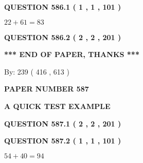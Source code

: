 \documentclass[12pt]{article}
\begin{document}
   
  
\vspace{0.2in}
  
{\textbf{\Large{QUESTION
586.1 
 ( 1 , 1 , 101 )
}}}
  
  
 
 

$ %
22 +  %
61=   %
83$
 
 
  
\vspace{0.2in}
  
{\textbf{\Large{QUESTION
586.2 
 ( 2 , 2 , 201 )
}}}
  
  
   
   
 \vspace{0.2in}
 
   
   
   
   
\vspace{1.0in} 
{\textbf{\large{ *** END OF PAPER, THANKS *** }}} 
   
   
\hspace{1.0in} By: 
 239 ( 416 ,  613 )
   
   
   
   
\newpage 
\setcounter{page}{ 
   587001 } 
   
   
   
   
 {\textbf{ \Large{ PAPER NUMBER  587  }}}
   
   
\vspace{0.2in}
   
   
   
   
   
   
 \vspace{0.2in}
{\LARGE {\textbf{ A QUICK TEST EXAMPLE}}}
   
   
  
\vspace{0.2in}
  
{\textbf{\Large{QUESTION
587.1 
 ( 2 , 2 , 201 )
}}}
  
  
  
\vspace{0.2in}
  
{\textbf{\Large{QUESTION
587.2 
 ( 1 , 1 , 101 )
}}}
  
  
 
 

$ %
54 +  %
40=   %
94$
 
 
   
\end{document}
